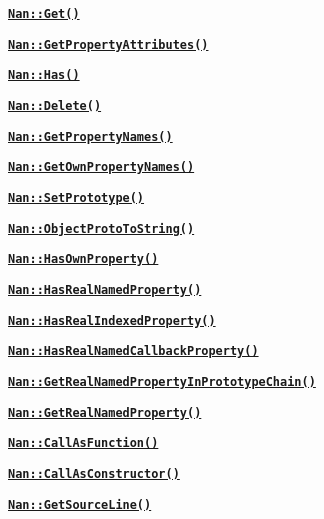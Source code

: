 \begin{DoxyItemize}
\begin{DoxyItemize}
\item \href{doc/maybe_types.md#api_nan_get}{\tt {\bfseries {\ttfamily Nan\+::\+Get()}}}
\item \href{doc/maybe_types.md#api_nan_get_property_attribute}{\tt {\bfseries {\ttfamily Nan\+::\+Get\+Property\+Attributes()}}}
\item \href{doc/maybe_types.md#api_nan_has}{\tt {\bfseries {\ttfamily Nan\+::\+Has()}}}
\item \href{doc/maybe_types.md#api_nan_delete}{\tt {\bfseries {\ttfamily Nan\+::\+Delete()}}}
\item \href{doc/maybe_types.md#api_nan_get_property_names}{\tt {\bfseries {\ttfamily Nan\+::\+Get\+Property\+Names()}}}
\item \href{doc/maybe_types.md#api_nan_get_own_property_names}{\tt {\bfseries {\ttfamily Nan\+::\+Get\+Own\+Property\+Names()}}}
\item \href{doc/maybe_types.md#api_nan_set_prototype}{\tt {\bfseries {\ttfamily Nan\+::\+Set\+Prototype()}}}
\item \href{doc/maybe_types.md#api_nan_object_proto_to_string}{\tt {\bfseries {\ttfamily Nan\+::\+Object\+Proto\+To\+String()}}}
\item \href{doc/maybe_types.md#api_nan_has_own_property}{\tt {\bfseries {\ttfamily Nan\+::\+Has\+Own\+Property()}}}
\item \href{doc/maybe_types.md#api_nan_has_real_named_property}{\tt {\bfseries {\ttfamily Nan\+::\+Has\+Real\+Named\+Property()}}}
\item \href{doc/maybe_types.md#api_nan_has_real_indexed_property}{\tt {\bfseries {\ttfamily Nan\+::\+Has\+Real\+Indexed\+Property()}}}
\item \href{doc/maybe_types.md#api_nan_has_real_named_callback_property}{\tt {\bfseries {\ttfamily Nan\+::\+Has\+Real\+Named\+Callback\+Property()}}}
\item \href{doc/maybe_types.md#api_nan_get_real_named_property_in_prototype_chain}{\tt {\bfseries {\ttfamily Nan\+::\+Get\+Real\+Named\+Property\+In\+Prototype\+Chain()}}}
\item \href{doc/maybe_types.md#api_nan_get_real_named_property}{\tt {\bfseries {\ttfamily Nan\+::\+Get\+Real\+Named\+Property()}}}
\item \href{doc/maybe_types.md#api_nan_call_as_function}{\tt {\bfseries {\ttfamily Nan\+::\+Call\+As\+Function()}}}
\item \href{doc/maybe_types.md#api_nan_call_as_constructor}{\tt {\bfseries {\ttfamily Nan\+::\+Call\+As\+Constructor()}}}
\item \href{doc/maybe_types.md#api_nan_get_source_line}{\tt {\bfseries {\ttfamily Nan\+::\+Get\+Source\+Line()}}}

\end{DoxyItemize}
\end{DoxyItemize}
